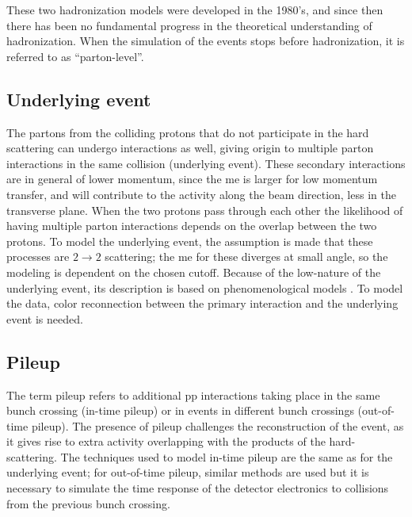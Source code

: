 

These two hadronization models were developed in the 1980's, and since then there has been no fundamental progress in the theoretical understanding of hadronization. 
When the simulation of the events stops before hadronization, it is referred to as ``parton-level''.

\subsection{Underlying event}

The partons from the colliding protons that do not participate in the hard scattering can undergo interactions as well, giving origin to multiple parton interactions in the same collision (underlying event).
These secondary interactions are in general of lower momentum, since the \gls{me} is larger for low momentum transfer, and will contribute to the activity along the beam direction, less in the transverse plane. 
When the two protons pass through each other the likelihood of having multiple parton interactions depends on the overlap between the two protons. 
To model the underlying event, the assumption is made that these processes are $2\rightarrow2$ scattering; the \gls{me} for these diverges at small angle, so the modeling is dependent on the chosen \pt cutoff. 
Because of the low-\pt nature of the underlying event, its description is based on phenomenological models \cite{ATL-PHYS-PUB-2014-021,Skands:2010ak}.
To model the data, color reconnection between the primary interaction and the underlying event is needed. 

\subsection{Pileup}

The term pileup refers to additional \gls{pp} interactions taking place in the same bunch crossing (in-time pileup) or in events in different bunch crossings (out-of-time pileup). 
The presence of pileup challenges the reconstruction of the event, as it gives rise to extra activity overlapping with the products of the hard-scattering. The techniques used to model in-time pileup are the same as for the underlying event; 
for out-of-time pileup, similar methods are used but it is necessary to simulate the time response of the detector electronics to collisions from the previous bunch crossing. 

